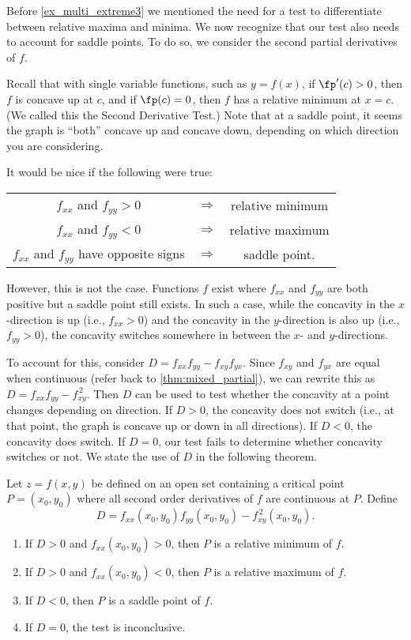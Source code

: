 Before \autoref{ex_multi_extreme3} we mentioned the need for a test to differentiate between relative maxima and minima. We now recognize that our test also needs to account for saddle points. To do so, we consider the second partial derivatives of $f$.

Recall that with single variable functions, such as $y=f(x)$, if $\fp'(c)>0$, then $f$ is concave up at $c$, and if $\fp(c) =0$, then $f$ has a relative minimum at $x=c$. (We called this the Second Derivative Test.) Note that at a saddle point, it seems the graph is ``both'' concave up and concave down, depending on which direction you are considering.

It would be nice if the following were true:
\begin{center}
	\begin{tabular}{ccc}
	$f_{xx}$ and $f_{yy} >0$ & $\Rightarrow$ & relative minimum\\
	$f_{xx}$ and $f_{yy} <0$ & $\Rightarrow$ & relative maximum\\
	$f_{xx}$ and $f_{yy}$ have opposite signs & $\Rightarrow$ & saddle point.
	\end{tabular}
\end{center}

However, this is not the case. Functions $f$ exist where $f_{xx}$ and $f_{yy}$ are both positive  but a saddle point still exists. In such a case, while the concavity in the $x$-direction is up (i.e., $f_{xx}>0$) and the concavity in the $y$-direction is also up (i.e., $f_{yy}>0$), the concavity switches somewhere in between the $x$- and $y$-directions.

To account for this, consider $D = f_{xx}f_{yy}-f_{xy}f_{yx}$. Since $f_{xy}$ and $f_{yx}$ are equal when continuous (refer back to \autoref{thm:mixed_partial}), we can rewrite this as $D = f_{xx}f_{yy}-f_{xy}^{\,2}$. Then $D$ can be used to test whether the concavity at a point changes depending on direction. If $D>0$, the concavity does not switch (i.e., at that point, the graph is concave up or down in all directions). If $D<0$, the concavity does switch. If $D=0$, our test fails to determine whether concavity switches or not. We state the use of $D$ in the following theorem.

\begin{theorem}\label{thm:multi_second_test}
Let $z=f(x,y)$ be defined on an open set containing a critical point $P=(x_0,y_0)$ where all second order derivatives of $f$ are continuous at $P$. Define
\[D = f_{xx}(x_0,y_0)f_{yy}(x_0,y_0)-f_{xy}^{\,2}(x_0,y_0).\]
\begin{enumerate}
	\item If $D>0$ and $f_{xx}(x_0,y_0)>0$, then $P$ is a relative minimum of $f$.
	\item If $D>0$ and $f_{xx}(x_0,y_0)<0$, then $P$ is a relative maximum of $f$.
	\item If $D<0$, then $P$ is a saddle point of $f$.
	\item If $D=0$, the test is inconclusive.
\end{enumerate}
\end{theorem}

